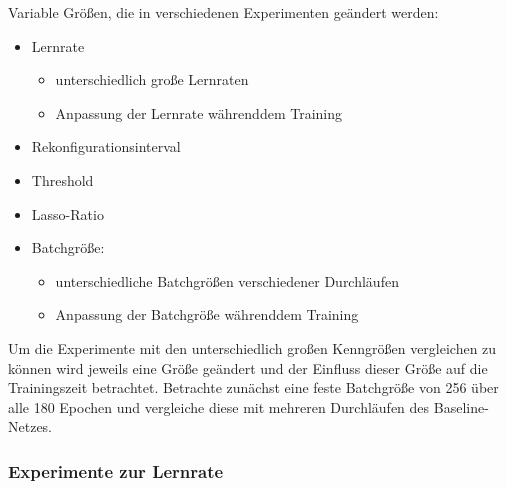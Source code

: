 Variable Größen, die in verschiedenen Experimenten geändert werden:

\begin{itemize}
 \item Lernrate
 \begin{itemize}
  \item unterschiedlich große Lernraten
  \item Anpassung der Lernrate währenddem Training
 \end{itemize}

 \item Rekonfigurationsinterval
 \item Threshold
 \item Lasso-Ratio
 \item Batchgröße:
 \begin{itemize}
  \item unterschiedliche Batchgrößen verschiedener Durchläufen
  \item Anpassung der Batchgröße währenddem Training
 \end{itemize}
\end{itemize}

Um die Experimente mit den unterschiedlich großen Kenngrößen vergleichen zu können wird jeweils eine Größe geändert und der Einfluss dieser Größe auf die Trainingszeit betrachtet. Betrachte zunächst eine feste Batchgröße von 256 über alle 180 Epochen und vergleiche diese mit mehreren Durchläufen des Baseline-Netzes. 
\subsubsection{Experimente zur Lernrate}

